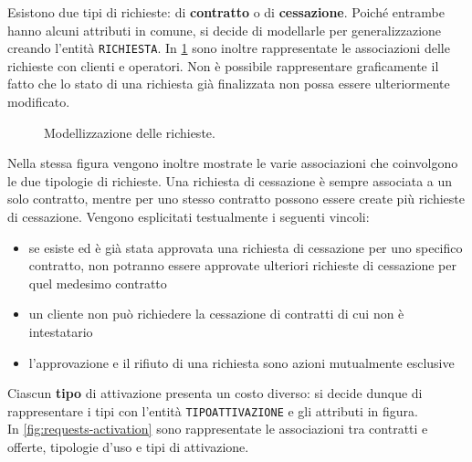 \documentclass[a4paper,12pt]{report}
\begin{document}
Esistono due tipi di richieste: di \textbf{contratto} o di \textbf{cessazione}. Poiché entrambe hanno alcuni attributi in comune, si decide di modellarle per generalizzazione creando l'entità \texttt{RICHIESTA}. In \cref{fig:requests} sono inoltre rappresentate le associazioni delle richieste con clienti e operatori. Non è possibile rappresentare graficamente il fatto che lo stato di una richiesta già finalizzata non possa essere ulteriormente modificato.

\begin{figure}[H]
\centering{}
%
\caption{Modellizzazione delle richieste.}
\label{fig:requests}
\end{figure}


Nella stessa figura vengono inoltre mostrate le varie associazioni che coinvolgono le due tipologie di richieste. Una richiesta di cessazione è sempre associata a un solo contratto, mentre per uno stesso contratto possono essere create più richieste di cessazione.
\newline
Vengono esplicitati testualmente i seguenti vincoli:
\begin{itemize}
    \item se esiste ed è già stata approvata una richiesta di cessazione per uno specifico contratto, non potranno essere approvate ulteriori richieste di cessazione per quel medesimo contratto
    \item un cliente non può richiedere la cessazione di contratti di cui non è intestatario
    \item l'approvazione e il rifiuto di una richiesta sono azioni mutualmente esclusive
\end{itemize}
Ciascun \textbf{tipo} di attivazione presenta un costo diverso: si decide dunque di rappresentare i tipi con l'entità \texttt{TIPO\textunderscore ATTIVAZIONE} e gli attributi in figura.\\[10pt]
In \cref{fig:requests-activation} sono rappresentate le associazioni tra contratti e offerte, tipologie d'uso e tipi di attivazione.
\end{document}
